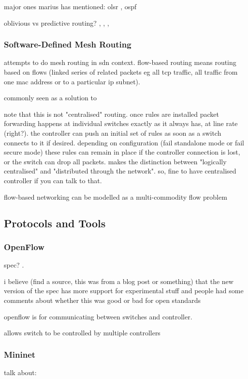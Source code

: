 \documentclass[pdftex,12pt,a4paper]{article}
\begin{document}
major ones marius has mentioned: olsr \cite{rfc3626}, ospf \cite{rfc5340}

oblivious vs predictive routing? \cite{wellons:augmenting}, \cite{dai:dynamic}, \cite{wang:routing}, 

\subsubsection{Software-Defined Mesh Routing}
attempts to do mesh routing in sdn context. flow-based routing means routing based on flows (linked series of related packets eg all tcp traffic, all traffic from one mac address or to a particular ip subnet).

commonly seen as a solution to 

note that this is not "centralised" routing. once rules are installed packet forwarding happens at individual switches exactly as it always has, at line rate (right?). the controller can push an initial set of rules as soon as a switch connects to it if desired. depending on configuration (fail standalone mode or fail secure mode) these rules can remain in place if the controller connection is lost, or the switch can drop all packets. \cite{handigol:asterix} makes the distinction between "logically centralised" and "distributed through the network". so, fine to have centralised controller if you can talk to that. 

flow-based networking \cite[pp. 862--863]{cormen:algorithms} can be modelled as a multi-commodity flow problem

\newpage
\subsection{Protocols and Tools}
\subsubsection{OpenFlow}
spec? \cite{onf:switch140}. 

i believe (find a source, this was from a blog post or something) that the new version of the spec \cite{onf:switch140} has more support for experimental stuff and people had some comments about whether this was good or bad for open standards

openflow is for communicating between switches and controller. 

allows switch to be controlled by multiple controllers \cite{mckeown:openflow}

\subsubsection{Mininet}
talk about:
\end{document}
